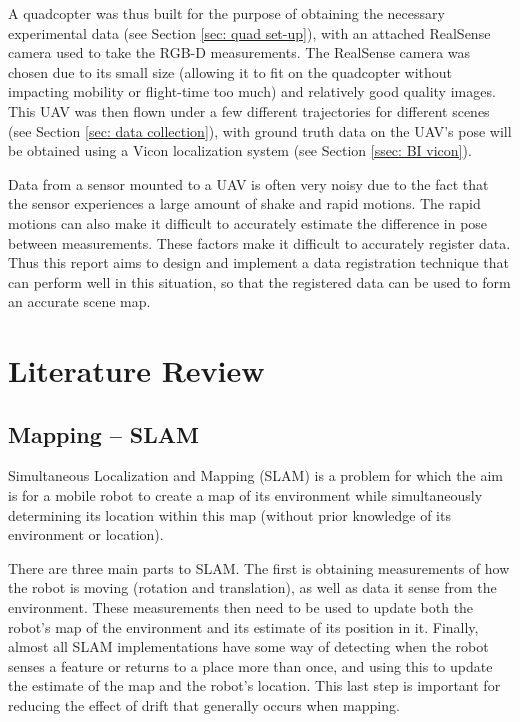\documentclass[12pt,a4paper]{article}
\begin{document}
  A quadcopter was thus built for the purpose of obtaining the necessary experimental data (see Section \ref{sec: quad set-up}), with an attached RealSense camera used to take the RGB-D measurements. The RealSense camera was chosen due to its small size (allowing it to fit on the quadcopter without impacting mobility or flight-time too much) and relatively good quality images. This UAV was then flown under a few different trajectories for different scenes (see Section \ref{sec: data collection}), with ground truth data on the UAV's pose will be obtained using a Vicon localization system (see Section \ref{ssec: BI vicon}). 
   
  Data from a sensor mounted to a UAV is often very noisy due to the fact that the sensor experiences a large amount of shake and rapid motions. The rapid motions can also make it difficult to accurately estimate the difference in pose between measurements. These factors make it difficult to accurately register data. Thus this report aims to design and implement a data registration technique that can perform well in this situation, so that the registered data can be used to form an accurate scene map.

\section{Literature Review}
  \label{sec: LR}

  \subsection{Mapping -- SLAM}
    \label{ssec: LR SLAM}
    Simultaneous Localization and Mapping (SLAM) is a problem for which the aim is for a mobile robot to create a map of its environment while simultaneously determining its location within this map (without prior knowledge of its environment or location). 
     
    There are three main parts to SLAM. The first is obtaining measurements of how the robot is moving (rotation and translation), as well as data it sense from the environment. These measurements then need to be used to update both the robot's map of the environment and its estimate of its position in it. Finally, almost all SLAM implementations have some way of detecting when the robot senses a feature or returns to a place more than once, and using this to update the estimate of the map and the robot's location. This last step is important for reducing the effect of drift that generally occurs when mapping.
     
\end{document}

